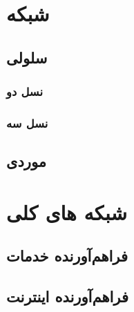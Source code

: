 \documentclass{book}
\begin{document}
\tableofcontents

\chapter{شبکه}
\section{سلولی}
\subsection{نسل دو}
\subsection{نسل سه}
\section{موردی}
\chapter{شبکه های کلی}
\section{فراهم‌آورنده خدمات}
\section{فراهم‌آورنده اینترنت}
\end{document}
